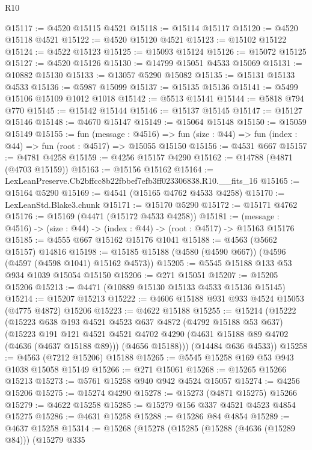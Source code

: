\begin{lexlean}{R10}
\begin{coremodule}
@15117 := @4520 @15115 @4521
@15118 := @15114 @15117
@15120 := @4520 @15118 @4521
@15122 := @4520 @15120 @4521
@15123 := @15102 @15122
@15124 := @4522 @15123
@15125 := @15093 @15124
@15126 := @15072 @15125
@15127 := @4520 @15126
@15130 := @14799 @15051 @4533 @15069
@15131 := @10882 @15130
@15133 := @13057 @5290 @15082
@15135 := @15131 @15133 @4533
@15136 := @5987 @15099
@15137 := @15135 @15136
@15141 := @5499 @15106 @15109 @1012 @1018
@15142 := @5513 @15141
@15144 := @5818 @794 @770
@15145 := @15142 @15144
@15146 := @15137 @15145
@15147 := @15127 @15146
@15148 := @4670 @15147
@15149 := @15064 @15148
@15150 := @15059 @15149
@15155 := fun (message : @4516) =>
  fun (size : @44) => fun (index : @44) => fun (root : @4517) => @15055 @15150
@15156 := @4531 @667
@15157 := @4781 @4258
@15159 := @4256 @15157 @4290
@15162 := @14788 (@4871 (@4703 @15159))
@15163 := @15156 @15162
@15164 := LexLeanPreserve.Cb2bffcc8b22fbbef7efb3ff023306838.R10.__fits_16
@15165 := @15164 @5290
@15169 := @4541 (@15165 @4762 @4533 @4258)
@15170 := LexLeanStd.Blake3.chunk
@15171 := @15170 @5290
@15172 := @15171 @4762
@15176 := @15169 (@4471 (@15172 @4533 @4258))
@15181 := (message : @4516) -> (size : @44) -> (index : @44) -> (root : @4517) -> @15163 @15176
@15185 := @4555 @667 @15162 @15176 @1041
@15188 := @4563 (@5662 @15157) @14816
@15198 := @15185 @15188 (@4580 (@4590 @667)) (@4596 (@4597 (@4598 @1041) @15162 @4573))
@15205 := @5545 @15188 @133 @53 @934 @1039 @15054 @15150
@15206 := @271 @15051
@15207 := @15205 @15206
@15213 := @4471 (@10889 @15130 @15133 @4533 @15136 @15145)
@15214 := @15207 @15213
@15222 := @4606 @15188 @931 @933 @4524 @15053 (@4775 @4872) @15206
@15223 := @4622 @15188
@15255 := @15214
    (@15222
      (@15223
        @638
        @193
        @4521
        @4523
        @637
        @4872
        (@4792 @15188 @53 @637)
        (@15223
          @191
          @121
          @4521
          @4521
          @4702
          @4290
          (@4631 @15188 @89 @4702 (@4636 (@4637 @15188 @89)))
          (@4656 @15188)))
      (@14484 @636 @4533))
@15258 := @4563 (@7212 @15206) @15188
@15265 := @5545 @15258 @169 @53 @943 @1038 @15058 @15149
@15266 := @271 @15061
@15268 := @15265 @15266 @15213
@15273 := @5761 @15258 @940 @942 @4524 @15057
@15274 := @4256 @15206
@15275 := @15274 @4290
@15278 := @15273 (@4871 @15275) @15266
@15279 := @4622 @15258
@15285 := @15279 @156 @337 @4521 @4523 @4854 @15275
@15286 := @4631 @15258
@15288 := @15286 @84 @4854
@15289 := @4637 @15258
@15314 := @15268
    (@15278
      (@15285
        (@15288 (@4636 (@15289 @84)))
        (@15279
          @335

\end{coremodule}
\end{lexlean}
